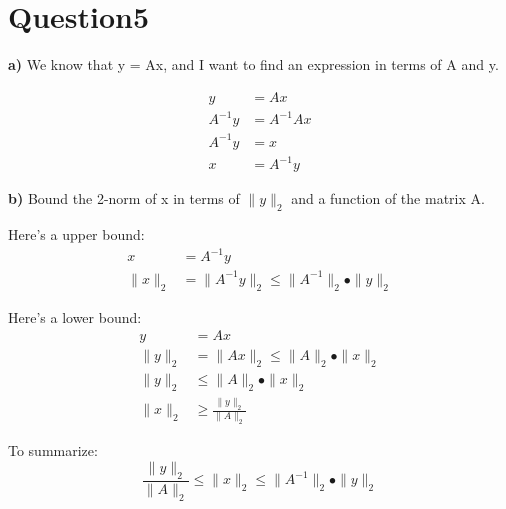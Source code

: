 \documentclass[paper=a4, fontsize=11pt]{scrartcl} %
\numberwithin{equation}{section} %
\numberwithin{figure}{section} %
\numberwithin{table}{section} %
\begin{document}
\newpage
\section*{Question5}
\textbf{a)} We know that y = Ax, and I want to find an expression in terms of A and y. 

\begin{align*} 
y &=  A x \\ 
A^{-1} y &=  A^{-1} A x \\
A^{-1} y &=  x \\
x &= A^{-1} y 
\end{align*}

\textbf{b)} Bound the 2-norm of x in terms of $\parallel y \parallel_2$ and a function of the matrix A. 

Here's a upper bound: 
\begin{align*} 
x &= A^{-1} y \\
\|x\|_2 &= \|A^{-1} y \|_2 \leq \|A^{-1}\|_2 \bullet \| y \|_2
\end{align*}

Here's a lower bound: 
\begin{align*} 
y &=  A x \\ 
\|y\|_2 &= \|A x\|_2 \leq \|A\|_2 \bullet \| x\|_2 \\
\|y\|_2 &\leq \|A\|_2 \bullet \| x\|_2 \\ 
\| x\|_2 &\geq \frac{\|y\|_2}{\|A\|_2}
\end{align*}


To summarize: 
$$
\frac{\|y\|_2}{\|A\|_2} \leq \| x\|_2  \leq \|A^{-1}\|_2 \bullet \| y \|_2
$$


\newpage
\end{document}
